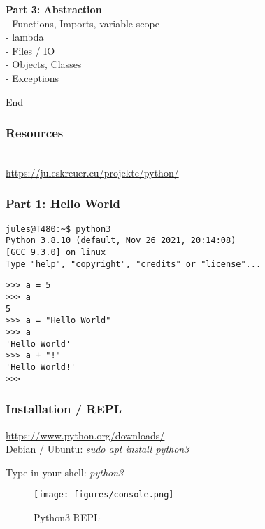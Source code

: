 \documentclass{beamer}
\begin{document}
\begin{frame}
	\begin{block}{}
		\textbf{Part 3: Abstraction}\\
		- Functions, Imports, variable scope\\
		- lambda\\
		- Files / IO\\
		- Objects, Classes\\
		- Exceptions\\
	\end{block}
	\begin{exampleblock}{}
	End
	\end{exampleblock}
\end{frame}
\begin{frame}[fragile]
	\frametitle{Resources}
	\center
	\\
	\center
	\url{https://juleskreuer.eu/projekte/python/}
\end{frame}

\begin{frame}[fragile]
	\frametitle{\textbf{Part 1:} Hello World}
	\begin{verbatim}
jules@T480:~$ python3
Python 3.8.10 (default, Nov 26 2021, 20:14:08) 
[GCC 9.3.0] on linux
Type "help", "copyright", "credits" or "license"...
	\end{verbatim}
\begin{verbatim}
>>> a = 5
>>> a
5
>>> a = "Hello World"
>>> a
'Hello World'
>>> a + "!"
'Hello World!'
>>> 
	\end{verbatim}
\end{frame}

\begin{frame}
	\frametitle{Installation / REPL}
	\begin{center}
		\url{https://www.python.org/downloads/}\\
		Debian / Ubuntu: \textit{sudo apt install python3}\\
	\end{center}
	\begin{center}
		Type in your shell: \textit{python3}
	\end{center}
\end{frame}

\begin{frame}
	\begin{figure}
		\texttt{[image: figures/console.png]}
		\caption{Python3 REPL}
	\end{figure}
\end{frame}
\end{document}
